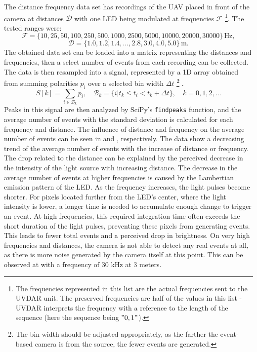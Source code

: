 The distance frequency data set has recordings of the \ac{UAV} placed in front of the camera at distances $\mathcal{D}$ with one \ac{LED} being modulated
at frequencies $\mathcal{F}$ \footnote{The frequencies represented in this list are the actual frequencies sent to the UVDAR unit. The preserved frequencies
are half of the values in this list - UVDAR interprets the frequency with a reference to the length of the sequence (here the sequence being $"0, 1"$).}.
The tested ranges were:
\[
\mathcal{F} = \{10, 25, 50, 100, 250, 500, 1000, 2500, 5000, 10000, 20000, 30000\} \, \text{Hz},
\]
\[
\mathcal{D} = \{1.0, 1.2, 1.4, \ldots, 2.8, 3.0, 4.0, 5.0\} \, \text{m}.
\]
The obtained data set can be loaded into a matrix representing the distances and frequencies, then a select number of events from each recording
can be collected.
The data is then resampled into a signal, represented by a 1D array obtained from summing polarities $p_i$ over a selected bin width $\Delta t$
\footnote{The bin width should be adjusted appropriately, as the farther the event-based camera is from the source, the fewer events are generated.} .
\begin{equation}
    S[k] = \sum_{i\in\mathcal{B}_k}p_i, \quad \mathcal{B}_k=\{i|t_k\leq t_i<t_k+\Delta t\}, \quad k = 0, 1, 2, \ldots
    \label{eq:signal}
\end{equation}
Peaks in this signal are then analyzed by SciPy's \texttt{findpeaks} function,
and the average number of events with the standard deviation is calculated for each frequency and distance.
The influence of distance and frequency on the average number of events can be seen in  and , respectively. The data show a decreasing trend of the average number of events
with the increase of distance or frequency. The drop related to the distance can be explained by the perceived decrease in the intensity of the light source
with increasing distance. The decrease in the average number of events at higher frequencies is caused by the Lambertian emission pattern of the \ac{LED}. As the frequency increases, the light pulses become shorter. For pixels located further from the \ac{LED}'s center, where the light intensity is lower,
a longer time is needed to accumulate enough change to trigger an event. At high frequencies, this required integration time often exceeds the short
duration of the light pulses, preventing these pixels from generating events. This leads to fewer total events and a perceived drop in brightness. 
On very high frequencies and distances, the camera is not able
to detect any real events at all, as there is more noise generated by the camera itself at this point. This can be observed
at  with a frequency of $30$ kHz at $3$ meters.

